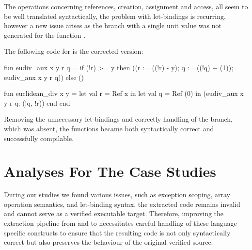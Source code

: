 The operations concerning references, creation, assignment and access, all seem to be well translated syntactically, the problem with
let-bindings is recurring, however a new issue arises as the  branch with a single unit value was not generated for the 
function .

The following code for \cml is the corrected version:

\begin{cakeml}
fun eudiv_aux x y r q =
  if (!r) >= y
  then ((r := ((!r) - y); q := ((!q) + (1)); eudiv_aux x y r q))
  else ()

fun euclidean_div x y =
  let val r = Ref x in
  let val q = Ref (0) in (eudiv_aux x y r q; (!q, !r)) 
    end end
\end{cakeml}

Removing the unnecessary let-bindings and correctly handling of the  branch, which was absent, the functions became 
both syntactically correct and successfully compilable.

\section{Analyses For The Case Studies}

During our studies we found various issues, such as exception scoping, array operation semantics, and let-binding syntax, the extracted 
code remains invalid and cannot serve as a verified executable target. Therefore, improving the extraction pipeline from \ocaml and 
\gospel to \cml necessitates careful handling of these language specific constructs to ensure that the resulting code is not only 
syntactically correct but also preserves the behaviour of the original verified source.
